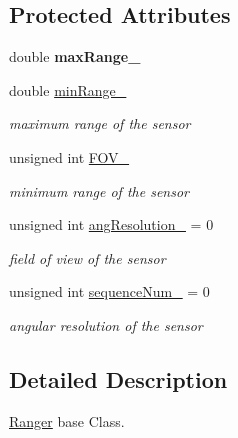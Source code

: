 \subsection*{Protected Attributes}
\begin{DoxyCompactItemize}
\item 
\mbox{\label{classRanger_aa92901df85f1818f27c0cf2e56ac2667}} 
double {\bfseries max\+Range\+\_\+}
\item 
\mbox{\label{classRanger_a3dddeb9eb109baf567dfcd356706c6fb}} 
double \hyperlink{classRanger_a3dddeb9eb109baf567dfcd356706c6fb}{min\+Range\+\_\+}
\begin{DoxyCompactList}\small\item\em maximum range of the sensor \end{DoxyCompactList}\item 
\mbox{\label{classRanger_acc6c665b0e64c74c837753aba184b19d}} 
unsigned int \hyperlink{classRanger_acc6c665b0e64c74c837753aba184b19d}{F\+O\+V\+\_\+}
\begin{DoxyCompactList}\small\item\em minimum range of the sensor \end{DoxyCompactList}\item 
\mbox{\label{classRanger_abf27486783526e849e3752036ea16ba7}} 
unsigned int \hyperlink{classRanger_abf27486783526e849e3752036ea16ba7}{ang\+Resolution\+\_\+} = 0
\begin{DoxyCompactList}\small\item\em field of view of the sensor \end{DoxyCompactList}\item 
\mbox{\label{classRanger_ae7402070c4b7ad80b2ab0af7e1dfc3b0}} 
unsigned int \hyperlink{classRanger_ae7402070c4b7ad80b2ab0af7e1dfc3b0}{sequence\+Num\+\_\+} = 0
\begin{DoxyCompactList}\small\item\em angular resolution of the sensor \end{DoxyCompactList}\end{DoxyCompactItemize}


\subsection{Detailed Description}
\hyperlink{classRanger}{Ranger} base Class. 

